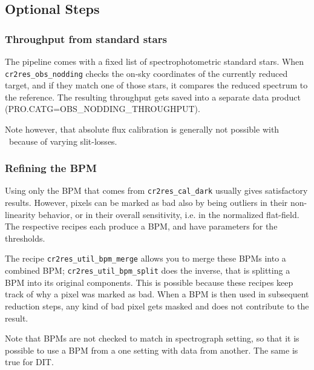 \subsection{Optional Steps}

\subsubsection{Throughput from standard stars}
\label{sec:throughput}
The pipeline comes with a fixed list of spectrophotometric standard stars. When \texttt{cr2res\_obs\_nodding} checks the
on-sky coordinates of the currently reduced target, and if they match one of those stars, it compares the reduced spectrum to the 
reference. The resulting throughput gets saved into a separate
data product (PRO.CATG=OBS\_NODDING\_THROUGHPUT).

Note however, that absolute flux calibration is generally not 
possible with \instrument\ because of varying slit-losses.


\subsubsection{Refining the BPM}
\label{sec:bpmrefine}
Using only the BPM that comes from \texttt{cr2res\_cal\_dark} usually gives
satisfactory results. However, pixels can be marked as bad also by being
outliers in their non-linearity behavior, or in their overall sensitivity, i.e.
in the normalized flat-field. The respective recipes each produce a BPM, and
have parameters for the thresholds.

The recipe \texttt{cr2res\_util\_bpm\_merge} allows you to merge these BPMs into
a combined BPM; \linebreak\texttt{cr2res\_util\_bpm\_split} does the inverse,
that is splitting a BPM into its original components. This is possible because
these recipes keep track of why a pixel was marked as bad. When a BPM is then
used in subsequent reduction steps, any kind of bad pixel gets masked and does
not contribute to the result.

Note that BPMs are not checked to match in spectrograph setting, so that it is
possible to use a BPM from a one setting with data from another. The same is
true for DIT.

